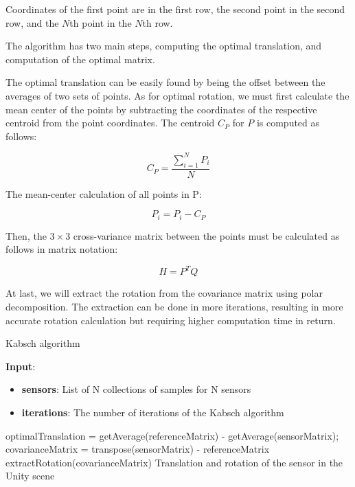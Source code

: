 Coordinates of the first point are in the first row, the second point in the second row, and the $N$th point in the $N$th row.

The algorithm has two main steps, computing the optimal translation, and computation of the optimal matrix.

The optimal translation can be easily found by being the offset between the averages of two sets of points. As for optimal rotation, we must first calculate the mean center of the points by subtracting the coordinates of the respective centroid from the point coordinates. The centroid $C_P$ for $P$ is computed as follows:

\begin{equation}
    {C_P = {\frac{\sum_{i=1}^{N}P_i}{N}}}
\end{equation}

The mean-center calculation of all points in P:

\begin{equation}
    {P_i = P_i - C_P}
\end{equation}

Then, the $3\times3$ cross-variance matrix between the points must be calculated as follows in matrix notation:

\begin{equation}
    {H = P^T Q}
\end{equation}

At last, we will extract the rotation from the covariance matrix using polar decomposition. The extraction can be done in more iterations, resulting in more accurate rotation calculation but requiring higher computation time in return.

\begin{algorithm}
	\caption{Kabsch algorithm}
	\label{alg:devicePositioning}
	\hspace*{\algorithmicindent} \textbf{Input}: 
	    \begin{itemize}
	        \item \textbf{sensors}: List of N collections of samples for N sensors
	        \item \textbf{iterations}: The number of iterations of the Kabsch algorithm
	    \end{itemize}
	\begin{algorithmic}[1]
		    \State optimalTranslation = getAverage(referenceMatrix) - getAverage(sensorMatrix);
			\State covarianceMatrix = transpose(sensorMatrix) - referenceMatrix
		    	\State extractRotation(covarianceMatrix)
		    \EndFor
		    \State Translation and rotation of the sensor in the Unity scene
		\EndFor
	\end{algorithmic} 
\end{algorithm}


